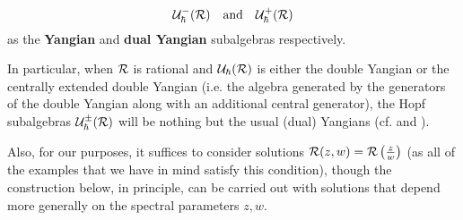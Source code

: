             $$\mathcal{U}_{\hbar}^-(\mathcal{R}) \quad \text{and} \quad \mathcal{U}_{\hbar}^+(\mathcal{R})$$
        as the \textbf{Yangian} and \textbf{dual Yangian} subalgebras respectively.
        \begin{example}
            In particular, when $\mathcal{R}$ is rational and $\mathcal{U}_{\hbar}(\mathcal{R})$ is either the double Yangian or the centrally extended double Yangian (i.e. the algebra generated by the generators of the double Yangian along with an additional central generator), the Hopf subalgebras $\mathcal{U}_{\hbar}^{\pm}(\mathcal{R})$ will be nothing but the usual (dual) Yangians (cf. \cite[Chapter 1]{molev_yangians_and_classical_lie_algebras} and \cite[Chapter 10]{molev_sugawara_operators_for_classical_lie_algebras}).
        \end{example}
        
        Also, for our purposes, it suffices to consider solutions $\mathcal{R}(z, w) = \mathcal{R}\left(\frac{z}{w}\right)$ (as all of the examples that we have in mind satisfy this condition), though the construction below, in principle, can be carried out with solutions that depend more generally on the spectral parameters $z, w$.
        
